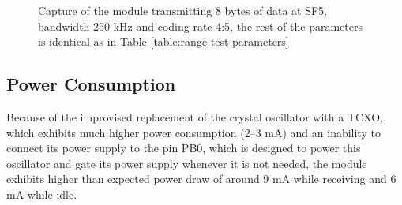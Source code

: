 \begin{figure}[p]
    \centering
     \hfil
    \caption{\label{fig:rf-power}Capture of the module transmitting 8 bytes of data at SF5, bandwidth 250 kHz and coding rate 4:5, the rest of the parameters is identical as in Table \ref{table:range-test-parameters}}
\end{figure}

\subsection{Power Consumption}
Because of the improvised replacement of the crystal oscillator with a TCXO, which exhibits much higher power consumption (2--3 mA) and an inability to connect its power supply to the pin PB0, which is designed to power this oscillator and gate its power supply whenever it is not needed, the module exhibits higher than expected power draw of around 9 mA while receiving and 6 mA while idle.

